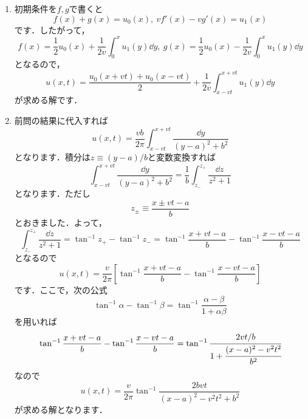 \documentclass[a4paper,pdflatex,ja=standard]{bxjsarticle}
\begin{document}
\begin{enumerate}
  \item 

  初期条件を$f,g$で書くと
  \begin{equation}
    f(x)+g(x)
    =
    u_0(x)
    ,\ 
    vf'(x)-vg'(x)
    =
    u_1(x)
  \end{equation}
  です．したがって，
  \begin{equation}
    f(x)
    =
    \frac{1}{2}u_0(x)
    +
    \frac{1}{2v}\int_{0}^{x} u_1(y)\dd y
    ,\ 
    g(x)
    =
    \frac{1}{2}u_0(x)
    -
    \frac{1}{2v}\int_{0}^{x} u_1(y)\dd y
  \end{equation}
  となるので，
  \begin{equation}
    u(x,t)
    =
    \frac{u_{0}(x+vt)+u_{0}(x-vt)}{2}
    +
    \frac{1}{2v}\int_{x-vt}^{x+vt}u_1(y)\dd y
  \end{equation}
  が求める解です．


  \item 

  前問の結果に代入すれば
  \begin{equation}
    u(x,t)
    =
    \frac{vb}{2\pi}
    \int_{x-vt}^{x+vt}
    \frac{\dd y}{(y-a)^2+b^2}
  \end{equation}
  となります．積分は$z\equiv (y-a)/b$と変数変換すれば
  \begin{equation}
    \int_{x-vt}^{x+vt}
    \frac{\dd y}{(y-a)^2+b^2}
    =
    \frac{1}{b}
    \int_{z_{-}}^{z_{+}}
    \frac{\dd z}{z^2+1}
  \end{equation}
  となります．ただし
  \begin{equation}
    z_{\pm}
    \equiv
    \frac{x\pm vt-a}{b}
  \end{equation}
  とおきました．よって，
  \begin{equation}    
    \int_{z_{-}}^{z_{+}}
    \frac{\dd z}{z^2+1}
    =
    \tan^{-1}z_{+}
    -
    \tan^{-1}z_{-}
    =
    \tan^{-1}
    \frac{x+vt-a}{b}
    -
    \tan^{-1}
    \frac{x-vt-a}{b} 
  \end{equation}
  となるので
  \begin{equation}
    u(x,t)
    =
    \frac{v}{2\pi}
    \left[  
      \tan^{-1}
      \frac{x+vt-a}{b}
      -
      \tan^{-1}
      \frac{x-vt-a}{b}       
    \right]
  \end{equation}
  です．ここで，次の公式
  \begin{equation}
    \tan^{-1}\alpha
    -
    \tan^{-1}\beta
    =
    \tan^{-1}
    \frac{\alpha-\beta}{1+\alpha\beta}
  \end{equation}
  を用いれば
  \begin{equation}
    \tan^{-1}
    \frac{x+vt-a}{b}
    -
    \tan^{-1}
    \frac{x-vt-a}{b}   
    =
    \tan^{-1}
    \cfrac{2vt/b}{1+\cfrac{(x-a)^2-v^2t^2}{b^2}}    
  \end{equation}
  なので
  \begin{equation}
    u(x,t)
    =
    \frac{v}{2\pi}
    \tan^{-1}
    \frac{2bvt}{(x-a)^2-v^2t^2+b^2}
  \end{equation}
  が求める解となります．



\end{enumerate}
\end{document}
